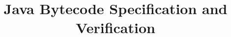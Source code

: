 \documentclass{sig-alternate}
\begin{document}

\title{ Java Bytecode Specification and Verification }



\maketitle



\begin{abstract}

\end{abstract}












\end{document}

